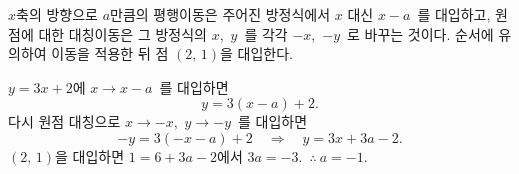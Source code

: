 \documentclass[10pt]{article}
\begin{document}
\begin{dmapproach}
$x$축의 방향으로 $a$만큼의 평행이동은 주어진 방정식에서 $x$ 대신 $x - a$\ 를 대입하고, 원점에 대한 대칭이동은 그 방정식의 $x$,\ $y$\ 를 각각 $-x$,\ $-y$\ 로 바꾸는 것이다. 순서에 유의하여 이동을 적용한 뒤 점 $(2,\, 1)$을 대입한다.
\end{dmapproach}

\begin{dmsolution}
$y = 3x + 2$에 $x \to x - a$\ 를 대입하면
\begin{equation*}
  y = 3(x - a) + 2.
\end{equation*}
다시 원점 대칭으로 $x \to -x$,\ $y \to -y$\ 를 대입하면
\begin{equation*}
  -y = 3(-x - a) + 2 \quad\Longrightarrow\quad y = 3x + 3a - 2.
\end{equation*}
$(2,\, 1)$을 대입하면 $1 = 6 + 3a - 2$에서 $3a = -3$.\ $\therefore\ a = -1$.
\end{dmsolution}

\dmchecktitle



\newpage

\dmconcepthead
{}
\end{document}
